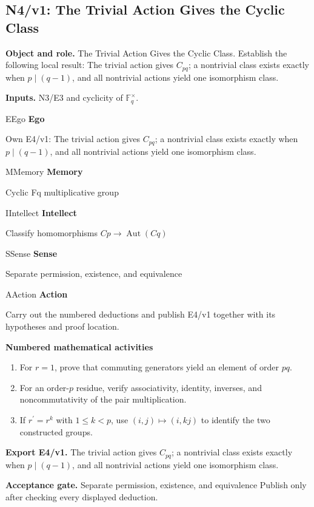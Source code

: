 \documentclass[preprint,12pt,aps,pra,showkeys,amsmath,amssymb,superscriptaddress,floatfix]{revtex4-2}
\theoremstyle{definition}
\theoremstyle{remark}
\newcommand{\mmfaculty}[3]{%
 \begin{mmfacultybox}{#1}{#2}
 {\sffamily\bfseries\color{MMBlue}#2}\par\smallskip #3
 \end{mmfacultybox}}
\newcommand{\field}[2]{\par\smallskip\noindent\textbf{#1.} #2\par}
\begin{document}
\clearpage

\subsection{N4/v1: The Trivial Action Gives the Cyclic Class}

\field{Object and role}{The Trivial Action Gives the Cyclic Class. Establish the following local
result: The trivial action gives \(C_{pq}\); a nontrivial class exists
exactly when \(p\mid(q-1)\), and all nontrivial actions yield one
isomorphism class.}

\field{Inputs}{N3/E3 and cyclicity of \(\mathbb F_q^\times\).}

\mmfaculty{E}{Ego}{Own E4/v1: The trivial action gives \(C_{pq}\); a nontrivial class
exists exactly when \(p\mid(q-1)\), and all nontrivial actions yield one
isomorphism class.}

\mmfaculty{M}{Memory}{Cyclic Fq multiplicative group}

\mmfaculty{I}{Intellect}{Classify homomorphisms \(Cp\to \operatorname{Aut} (Cq)\)}

\mmfaculty{S}{Sense}{Separate permission, existence, and equivalence}

\mmfaculty{A}{Action}{Carry out the numbered deductions and publish E4/v1 together with its
hypotheses and proof location.}

\smallskip\noindent\textbf{Numbered mathematical activities}

\begin{enumerate}[label=N4.\arabic*,leftmargin=3.4em]

\item For \(r=1\), prove that commuting generators yield an element of order
\(pq\).

\item For an order-\(p\) residue, verify associativity, identity, inverses,
and noncommutativity of the pair multiplication.

\item If \(r^{\prime}=r^k\) with \(1\le k<p\), use \((i,j)\mapsto(i,kj)\) to
identify the two constructed groups.

\end{enumerate}

\field{Export E4/v1}{The trivial action gives \(C_{pq}\); a nontrivial class exists exactly
when \(p\mid(q-1)\), and all nontrivial actions yield one isomorphism
class.}

\field{Acceptance gate}{Separate permission, existence, and equivalence Publish only after
checking every displayed deduction.}
\end{document}
